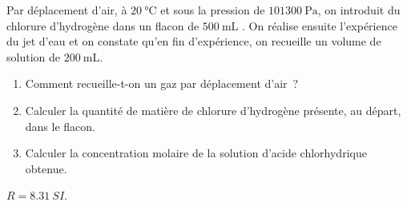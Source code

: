 Par déplacement d'air, à $\qty{20}{\degreeCelsius}$ et sous la pression de
$\qty{101300}{\Pa}$, on introduit du chlorure d'hydrogène dans un flacon de
$\qty{500}{\mL}$ . On réalise ensuite l'expérience du jet d'eau et on constate
qu'en fin d'expérience, on recueille un volume de solution de $\qty{200}{\mL}$.
\begin{enumerate}
    \item Comment recueille-t-on un gaz par déplacement d'air~?
    \item Calculer la quantité de matière de chlorure d'hydrogène présente, au
          départ, dans le flacon.
    \item Calculer la concentration molaire de la solution d'acide chlorhydrique
          obtenue.
\end{enumerate}
\begin{donnees}
    $R=\qty{8.31}{SI}$.
\end{donnees}


